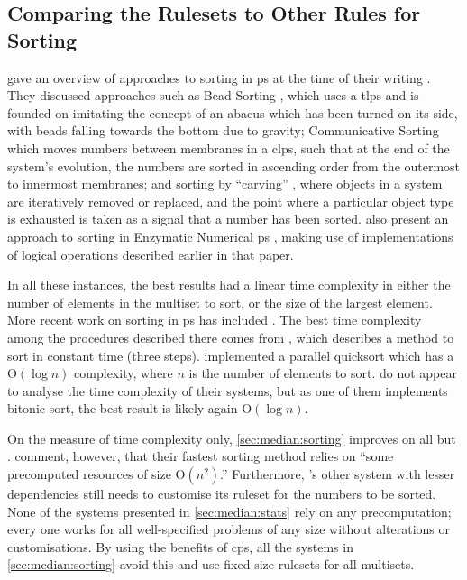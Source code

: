 \subsection{Comparing the  Rulesets to Other  Rules for Sorting}

\citeauthor{Ceterchi2010} gave an overview of approaches to sorting in \gls{ps} at the time of their writing \cite{Ceterchi2010}.  They discussed approaches such as Bead Sorting \cite{Arulanandham2002}, which uses a \gls{tlps} and is founded on imitating the concept of an abacus which has been turned on its side, with beads falling towards the bottom due to gravity; Communicative Sorting \cite[Sec. 5.2]{Alhazov2007} which moves numbers between membranes in a \gls{clps}, such that at the end of the system's evolution, the numbers are sorted in ascending order from the outermost to innermost membranes; and sorting by ``carving'' \cite{Alhazov2007}, where objects in a system are iteratively removed or replaced, and the point where a particular object type is exhausted is taken as a signal that a number has been sorted.  \citeauthor{Maeda2014} also present an approach to sorting in Enzymatic Numerical \gls{ps} \cite{Maeda2014}, making use of implementations of logical operations described earlier in that paper.

In all these instances, the best results had a linear time complexity in either the number of elements in the multiset to sort, or the size of the largest element.  More recent work on sorting in \gls{ps} has included \cite{Gheorghe2017,Metta2015,Yan2019}.  The best time complexity among the procedures described there comes from \cite[Sec. 3.3]{Gheorghe2017}, which describes a method to sort in constant time (three steps).  \citeauthor{Yan2019} \cite{Yan2019} implemented a parallel quicksort which has a O\((\log n)\) complexity, where \(n\) is the number of elements to sort.  \citeauthor{Metta2015} \cite{Metta2015} do not appear to analyse the time complexity of their systems, but as one of them implements bitonic sort, the best result is likely again O\((\log n)\).

On the measure of time complexity only, \cref{sec:median:sorting} improves on all but \cite{Gheorghe2017}.  \citeauthor{Gheorghe2017} comment, however, that their fastest sorting method relies on ``some precomputed resources of size O\((n^2)\).''  Furthermore, \cite{Gheorghe2017}'s other system with lesser dependencies still needs to customise its \gls{ruleset} for the numbers to be sorted.  None of the systems presented in \cref{sec:median:stats} rely on any precomputation; every one works for all well-specified problems of any size without alterations or customisations.  By using the benefits of \gls{cps}, all the systems in \cref{sec:median:sorting} avoid this and use fixed-size \glspl{ruleset} for all multisets.

